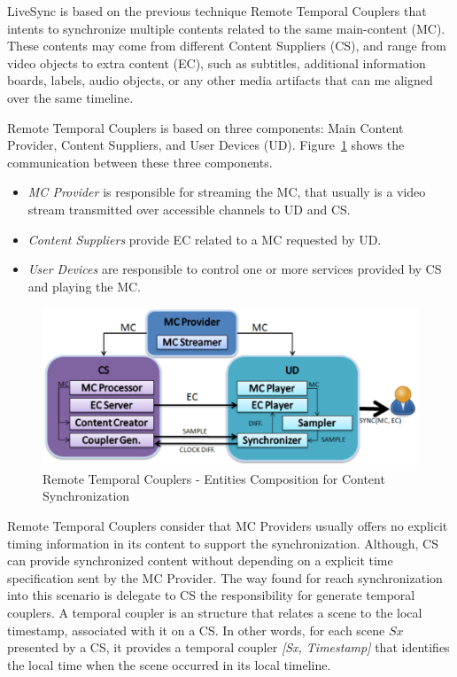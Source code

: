 LiveSync is based on the previous technique Remote Temporal Couplers \cite{segundo2015remote} that intents to synchronize multiple contents related to the same main-content (MC). These contents may come from different Content Suppliers (CS), and range from video objects to extra content (EC), such as subtitles, additional information boards, labels, audio objects, or any other media artifacts that can me aligned over the same timeline.

Remote Temporal Couplers is based on three components: Main Content Provider, Content Suppliers, and User Devices (UD). Figure~\ref{rtc} \cite{segundo2015remote} shows the communication between these three components.

\begin{itemize}

\item \textit{MC Provider} is responsible for streaming the MC, that usually is a video stream transmitted over accessible channels to UD and CS.

\item \textit{Content Suppliers} provide EC related to a MC requested by UD. 

\item \textit{User Devices} are responsible to control one or more services provided by CS and playing the MC.
 
\end{itemize}


\begin{figure}[h!]
	\centering
	\includegraphics[scale=0.4]{figures/rtc}
	\caption{Remote Temporal Couplers - Entities Composition for Content Synchronization}
	\label{rtc}
\end{figure}

Remote Temporal Couplers consider that MC Providers usually offers no explicit timing information in its content to support the synchronization. Although, CS can provide synchronized content without depending on a explicit time specification sent by the MC Provider. The way found for reach synchronization into this scenario is delegate to CS the responsibility  for generate temporal couplers. A temporal coupler is an structure that relates a scene to the local timestamp, associated with it on a CS. In other words, for each scene $Sx$ presented by a CS, it provides a temporal coupler \textit{[Sx, Timestamp]} that identifies the local time when the scene occurred in its local timeline.

